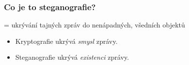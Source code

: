 \documentclass{beamer}
\begin{document}

\begin{frame}
\frametitle{Co je to steganografie?}

= ukrývání tajných zpráv do nenápadných, všedních objektů

\begin{itemize}
\item<2-> Kryptografie ukrývá {\it smysl} zprávy.
\item<3-> Steganografie ukrývá {\it existenci} zprávy.
\end{itemize}
\end{frame}

\providecommand{\iconKEY}[1]{\tikz[line width=1.2pt]{%
	\draw [yellow!90!black, -] (0,0) circle (.1);
	\draw [yellow!90!black, -] (-.1,0) -| (-.4,-.1);
	\draw [yellow!90!black, -] (-.1,0) -| (-.5,-.075);
	\draw [yellow!90!black, -] (-.1,0) -| (-.6,-.1);
	\draw (-.35,-.05) node [above, inner sep=2.5pt] {\scriptsize #1};
}}
\end{document}

